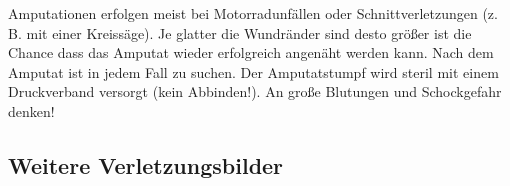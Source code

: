Amputationen erfolgen meist bei Motorradunfällen oder
Schnittverletzungen (z.\,B. mit einer Kreissäge). Je glatter
die Wundränder sind desto größer ist die Chance dass das
Amputat wieder erfolgreich angenäht werden kann. Nach dem
Amputat ist in jedem Fall zu suchen. Der Amputatstumpf wird
steril mit einem Druckverband versorgt (kein Abbinden!). An
große Blutungen und Schockgefahr denken!

 {%
}{}

\subsection{Weitere Verletzungsbilder}


